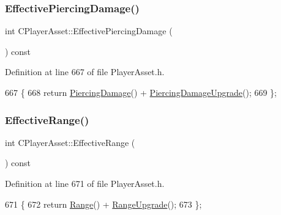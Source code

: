 \subsubsection{\texorpdfstring{Effective\+Piercing\+Damage()}{EffectivePiercingDamage()}}
{\footnotesize\ttfamily int C\+Player\+Asset\+::\+Effective\+Piercing\+Damage (\begin{DoxyParamCaption}{ }\end{DoxyParamCaption}) const\hspace{0.3cm}{\ttfamily [inline]}}



Definition at line 667 of file Player\+Asset.\+h.


\begin{DoxyCode}
667                                            \{
668             \textcolor{keywordflow}{return} \hyperlink{classCPlayerAsset_a1949069b1bec611fdfa74488a3d6864f}{PiercingDamage}() + \hyperlink{classCPlayerAsset_af7403a6a0eab4eaedd2b04d66e21d601}{PiercingDamageUpgrade}();
669         \};
\end{DoxyCode}
\hypertarget{classCPlayerAsset_af2a2747655729e3a58586f28ddd7cd8d}{}\label{classCPlayerAsset_af2a2747655729e3a58586f28ddd7cd8d} 
\subsubsection{\texorpdfstring{Effective\+Range()}{EffectiveRange()}}
{\footnotesize\ttfamily int C\+Player\+Asset\+::\+Effective\+Range (\begin{DoxyParamCaption}{ }\end{DoxyParamCaption}) const\hspace{0.3cm}{\ttfamily [inline]}}



Definition at line 671 of file Player\+Asset.\+h.


\begin{DoxyCode}
671                                   \{
672             \textcolor{keywordflow}{return} \hyperlink{classCPlayerAsset_a717695212dd7159bd0b6e97d4ae5cf9b}{Range}() + \hyperlink{classCPlayerAsset_aad35da7eb13a1d5830471a0f6de5090e}{RangeUpgrade}();
673         \};
\end{DoxyCode}
\hypertarget{classCPlayerAsset_a69a1226429ded98b31fde2623d0058bf}{}\label{classCPlayerAsset_a69a1226429ded98b31fde2623d0058bf} 
